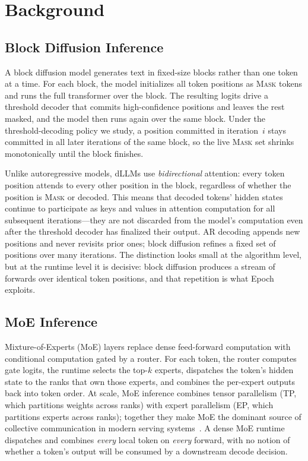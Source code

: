 \documentclass[sigconf,review,anonymous, 10pt]{acmart}
\newcommand{\sys}{Epoch}
\newcommand{\mask}{\textsc{Mask}}
\begin{document}
\section{Background}

\subsection{Block Diffusion Inference}

A block diffusion model generates text in fixed-size blocks rather than one token at a time.
For each block, the model initializes all token positions as \mask{} tokens and runs the full transformer over the block.
The resulting logits drive a threshold decoder that commits high-confidence positions and leaves the rest masked, and the model then runs again over the same block.
Under the threshold-decoding policy we study, a position committed in iteration~$i$ stays committed in all later iterations of the same block, so the live \mask{} set shrinks monotonically until the block finishes.

Unlike autoregressive models, dLLMs use \emph{bidirectional} attention: every token position attends to every other position in the block, regardless of whether the position is \mask{} or decoded.
This means that decoded tokens' hidden states continue to participate as keys and values in attention computation for all subsequent iterations---they are not discarded from the model's computation even after the threshold decoder has finalized their output.
AR decoding appends new positions and never revisits prior ones; block diffusion refines a fixed set of positions over many iterations.
The distinction looks small at the algorithm level, but at the runtime level it is decisive: block diffusion produces a stream of forwards over identical token positions, and that repetition is what \sys{} exploits.

\subsection{MoE Inference}

Mixture-of-Experts (MoE) layers replace dense feed-forward computation with conditional computation gated by a router.
For each token, the router computes gate logits, the runtime selects the top-$k$ experts, dispatches the token's hidden state to the ranks that own those experts, and combines the per-expert outputs back into token order.
At scale, MoE inference combines tensor parallelism (TP, which partitions weights across ranks) with expert parallelism (EP, which partitions experts across ranks); together they make MoE the dominant source of collective communication in modern serving systems~\cite{vllm,sglang,moe}.
A dense MoE runtime dispatches and combines \emph{every} local token on \emph{every} forward, with no notion of whether a token's output will be consumed by a downstream decode decision.
\end{document}
